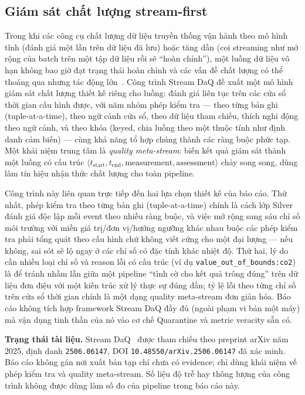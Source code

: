 \subsection{Giám sát chất lượng stream-first}

Trong khi các công cụ chất lượng dữ liệu truyền thống vận hành theo mô hình
tĩnh (đánh giá một lần trên dữ liệu đã lưu) hoặc tăng dần (coi streaming như
mở rộng của batch trên một tập dữ liệu rồi sẽ ``hoàn chỉnh''), một luồng dữ
liệu vô hạn không bao giờ đạt trạng thái hoàn chỉnh và các vấn đề chất lượng
có thể thoáng qua nhưng tác động lớn~\cite{stream_daq_2024}. Công trình
Stream DaQ đề xuất một mô hình giám sát chất lượng thiết kế riêng cho luồng:
đánh giá liên tục trên các cửa sổ thời gian cấu hình được, với năm nhóm phép
kiểm tra --- theo từng bản ghi (tuple-at-a-time), theo ngữ cảnh cửa sổ, theo dữ
liệu tham chiếu, thích nghi động theo ngữ cảnh, và theo khóa (keyed, chia luồng
theo một thuộc tính như định danh cảm biến) --- cùng khả năng tổ hợp chúng
thành các ràng buộc phức tạp. Một khái niệm trung tâm là \emph{quality
meta-stream}: biến kết quả giám sát thành một luồng có cấu trúc
$\langle t_{\text{start}}, t_{\text{end}}, \text{measurement}, \text{assessment}\rangle$
chảy song song, dùng làm tín hiệu nhận thức chất lượng cho toàn pipeline.

Công trình này liên quan trực tiếp đến hai lựa chọn thiết kế của báo cáo. Thứ
nhất, phép kiểm tra theo từng bản ghi (tuple-at-a-time) chính là cách lớp Silver
đánh giá độc lập mỗi event theo nhiều ràng buộc, và việc mở rộng sang sáu chỉ
số môi trường với miền giá trị/đơn vị/hướng ngưỡng khác nhau buộc các phép kiểm
tra phải tổng quát theo cấu hình chứ không viết cứng cho một đại lượng --- nếu
không, sai sót sẽ lộ ngay ở các chỉ số có đặc tính khác nhiệt độ. Thứ hai, lý
do cần nhiều loại chỉ số và reason lỗi có cấu trúc (ví dụ
\texttt{value\_out\_of\_bounds:co2}) là để tránh nhầm lẫn giữa một pipeline
``tình cờ cho kết quả trông đúng'' trên dữ liệu đơn điệu với một kiến trúc xử lý
thực sự đúng đắn; tỷ lệ lỗi theo từng chỉ số trên cửa sổ thời gian chính là một
dạng quality meta-stream đơn giản hóa. Báo cáo không tích hợp framework Stream
DaQ đầy đủ (ngoài phạm vi bản một máy) mà vận dụng tinh thần của nó vào cơ chế
Quarantine và metric veracity sẵn có.

\textbf{Trạng thái tài liệu.} Stream DaQ~\cite{stream_daq_2024} được tham
chiếu theo preprint arXiv năm 2025, định danh \texttt{2506.06147}, DOI
\texttt{10.48550/arXiv.2506.06147} đã xác minh. Báo cáo không gán nơi
xuất bản tạp chí chưa có evidence; chỉ dùng khái niệm về phép kiểm tra và
quality meta-stream. Số liệu độ trễ hay thông lượng của công trình không
được dùng làm số đo của pipeline trong báo cáo này.

